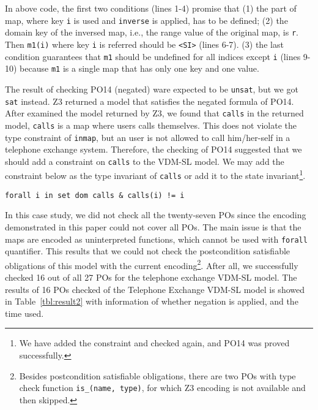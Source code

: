 In above code, the first two conditions (lines 1-4) promise that (1) the part of map, where key {\tt i} is used and {\tt inverse} is applied, has to be defined; (2) the domain key of the inversed map, i.e., the range value of the original map, is {\tt r}. Then {\tt m1(i)} where key {\tt i} is referred should be {\tt <SI>} (lines 6-7). (3) the last condition guarantees that {\tt m1} should be undefined for all indices except {\tt i} (lines 9-10) because {\tt m1} is a single map that has only one key and one value.

The result of checking PO14 (negated) ware expected to be {\tt unsat}, but we got {\tt sat} instead. Z3 returned a model that satisfies the negated formula of PO14. After examined the model returned by Z3, we found that {\tt calls} in the returned model, {\tt calls} is a map where users calls themselves. This does not violate the type constraint of {\tt inmap}, but an user is not allowed to call him/her-self in a telephone exchange system. Therefore, the checking of PO14 suggested that we should add a constraint on {\tt calls} to the VDM-SL model. We may add the constraint below as the type invariant of {\tt calls} or add it to the state invariant\footnote{We have added the constraint and checked again, and PO14 was proved successfully.}.

\begin{mdframed}[roundcorner=5pt]
\begin{Verbatim}[fontsize=\small]
forall i in set dom calls & calls(i) != i
\end{Verbatim}
\end{mdframed}

In this case study, we did not check all the twenty-seven POs since the encoding demonstrated in this paper could not cover all POs. The main issue is that the maps are encoded as uninterpreted functions, which cannot be used with {\tt forall} quantifier. This results that we could not check the postcondition satisfiable obligations of this model with the current encoding\footnote{Besides postcondition satisfiable obligations, there are two POs with type check function {\tt is\_(name, type)}, for which Z3 encoding is not available and then skipped.}. After all, we successfully checked 16 out of all 27 POs for the telephone exchange VDM-SL model. The results of 16 POs checked of the Telephone Exchange VDM-SL model is showed in Table~\ref{tbl:result2} with information of whether negation is applied, and the time used.

